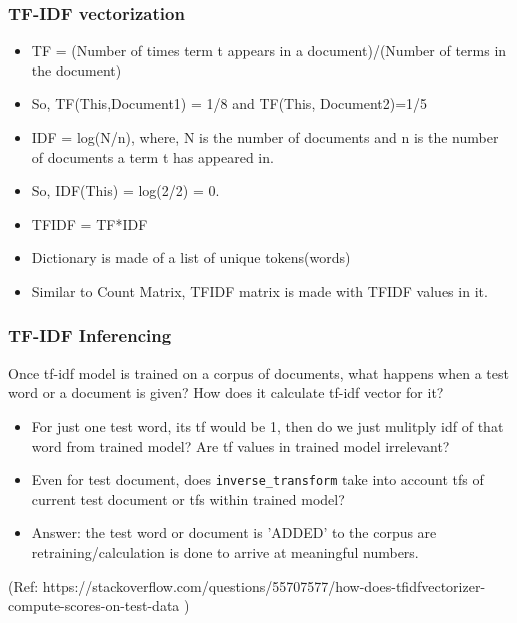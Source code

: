 \begin{frame}[fragile]\frametitle{TF-IDF vectorization}
\begin{itemize}
\item TF = (Number of times term t appears in a document)/(Number of terms in the document)
\item So, TF(This,Document1) = 1/8  and TF(This, Document2)=1/5
\item IDF = log(N/n), where, N is the number of documents and n is the number of documents a term t has appeared in.
\item So, IDF(This) = log(2/2) = 0.
\item TFIDF = TF*IDF
\item Dictionary is made of a list of unique tokens(words) 
\item Similar to Count Matrix, TFIDF matrix is made with TFIDF values in it.
\end{itemize}
\end{frame}

\begin{frame}[fragile]\frametitle{TF-IDF Inferencing}
Once tf-idf model is trained on a corpus of documents, what happens when a test word or a document is given? How does it calculate tf-idf vector for it?
\begin{itemize}
\item For just one test word, its tf would be 1, then do we just mulitply idf of that word from trained model? Are tf values in trained model irrelevant?
\item Even for test document, does \lstinline|inverse_transform| take into account tfs of current test document or tfs within trained model?
\item Answer: the test word or document is 'ADDED' to the corpus are retraining/calculation is done to arrive at meaningful numbers.
\end{itemize}

{\tiny (Ref: https://stackoverflow.com/questions/55707577/how-does-tfidfvectorizer-compute-scores-on-test-data )}
\end{frame}

